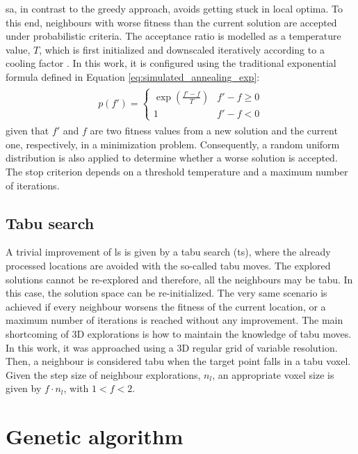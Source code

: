 \acrshort{sa}, in contrast to the greedy approach, avoids getting stuck in local optima. To this end, neighbours with worse fitness than the current solution are accepted under probabilistic criteria. The acceptance ratio is modelled as a temperature value, $T$, which is first initialized and downscaled iteratively according to a cooling factor \cite{wieckowski_finding_2020}. In this work, it is configured using the traditional exponential formula defined in Equation \ref{eq:simulated_annealing_exp}: 
\begin{gather}
    \label{eq:simulated_annealing_exp}
    \begin{aligned}
        p(f') =
        \begin{cases}
            \exp(\frac{f'-f}{T}) &f'-f \geq 0\\
            1 &f'-f < 0
        \end{cases}
    \end{aligned}
\end{gather}
given that $f'$ and $f$ are two fitness values from a new solution and the current one, respectively, in a minimization problem. Consequently, a random uniform distribution is also applied to determine whether a worse solution is accepted. The stop criterion depends on a threshold temperature and a maximum number of iterations.

\subsection{Tabu search}

A trivial improvement of \acrshort{ls} is given by a tabu search (\acrshort{ts}), where the already processed locations are avoided with the so-called tabu moves. The explored solutions cannot be re-explored and therefore, all the neighbours may be tabu. In this case, the solution space can be re-initialized. The very same scenario is achieved if every neighbour worsens the fitness of the current location, or a maximum number of iterations is reached without any improvement. The main shortcoming of 3D explorations is how to maintain the knowledge of tabu moves. In this work, it was approached using a 3D regular grid of variable resolution. Then, a neighbour is considered tabu when the target point falls in a tabu voxel. Given the step size of neighbour explorations, $n_l$, an appropriate voxel size is given by $f \cdot n_l$, with $1 < f < 2$.

\section{Genetic algorithm}

